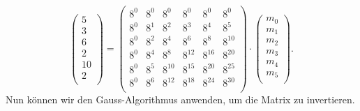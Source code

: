 \[
\begin{pmatrix}
	5 \\ 3 \\ 6 \\ 2 \\ 10 \\ 2 \\
\end{pmatrix}
=
\begin{pmatrix}
	8^0&    8^0&    8^0&    8^0&    8^0&    8^0\\
	8^0&	8^1&	8^2&	8^3&	8^4&	8^5\\
	8^0&	8^2&	8^4&	8^6&	8^8& 8^{10}\\
	8^0&	8^4&	8^8& 8^{12}& 8^{16}& 8^{20}\\
	8^0&	8^5& 8^{10}& 8^{15}& 8^{20}& 8^{25}\\
	8^0&	8^6& 8^{12}& 8^{18}& 8^{24}& 8^{30}\\
\end{pmatrix}
\cdot
\begin{pmatrix}
	m_0 \\ m_1 \\ m_2 \\ m_3 \\ m_4 \\ m_5 \\
\end{pmatrix}
.
\]
Nun können wir den Gauss-Algorithmus anwenden, um die Matrix zu invertieren.
